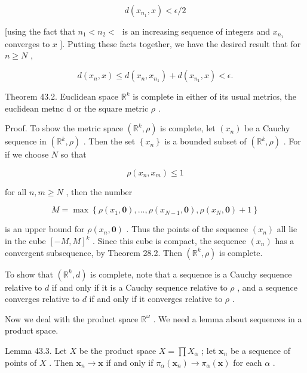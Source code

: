 \documentclass[10pt]{article}
\begin{document}
\[
d\left( {{x}_{{n}_{1}},x}\right)  < \epsilon /2
\]

[using the fact that \({n}_{1} < {n}_{2} < \;\) is an increasing sequence of integers and \({x}_{{n}_{1}}\) converges to \(x\) ]. Putting these facts together, we have the desired result that for \(n \geq  N\) ,

\[
d\left( {{x}_{n},x}\right)  \leq  d\left( {{x}_{n},{x}_{{n}_{1}}}\right)  + d\left( {{x}_{{n}_{1}},x}\right)  < \epsilon .
\]

Theorem 43.2. Euclidean space \({\mathbb{R}}^{k}\) is complete in either of its usual metrics, the euclidean metnc d or the square metric \(\rho\) .

Proof. To show the metric space \(\left( {{\mathbb{R}}^{k},\rho }\right)\) is complete, let \(\left( {x}_{n}\right)\) be a Cauchy sequence in \(\left( {{\mathbb{R}}^{k},\rho }\right)\) . Then the set \(\left\{  {x}_{n}\right\}\) is a bounded subset of \(\left( {{\mathbb{R}}^{k},\rho }\right)\) . For if we choose \(N\) so that

\[
\rho \left( {{x}_{n},{x}_{m}}\right)  \leq  1
\]

for all \(n,m \geq  N\) , then the number

\[
M = \max \left\{  {\rho \left( {{x}_{1},\mathbf{0}}\right) ,\ldots ,\rho \left( {{x}_{N - 1},\mathbf{0}}\right) ,\rho \left( {{x}_{N},\mathbf{0}}\right)  + 1}\right\}
\]

is an upper bound for \(\rho \left( {{x}_{n},\mathbf{0}}\right)\) . Thus the points of the sequence \(\left( {x}_{n}\right)\) all lie in the cube \({\left\lbrack  -M,M\right\rbrack  }^{k}\) . Since this cube is compact, the sequence \(\left( {x}_{n}\right)\) has a convergent subsequence, by Theorem 28.2. Then \(\left( {{\mathbb{R}}^{k},\rho }\right)\) is complete.

To show that \(\left( {{\mathbb{R}}^{k},d}\right)\) is complete, note that a sequence is a Cauchy sequence relative to \(d\) if and only if it is a Cauchy sequence relative to \(\rho\) , and a sequence converges relative to \(d\) if and only if it converges relative to \(\rho\) .

Now we deal with the product space \({\mathbb{R}}^{\omega }\) . We need a lemma about sequences in a product space.

Lemma 43.3. Let \(X\) be the product space \(X = \prod {X}_{\alpha }\) ; let \({\mathbf{x}}_{n}\) be a sequence of points of \(X\) . Then \({\mathbf{x}}_{n} \rightarrow  \mathbf{x}\) if and only if \({\pi }_{\alpha }\left( {\mathbf{x}}_{n}\right)  \rightarrow  {\pi }_{\alpha }\left( \mathbf{x}\right)\) for each \(\alpha\) .
\end{document}
